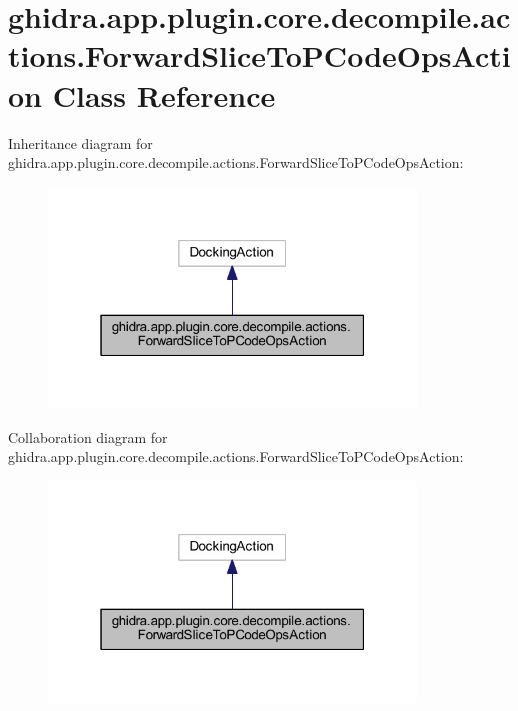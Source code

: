 \hypertarget{classghidra_1_1app_1_1plugin_1_1core_1_1decompile_1_1actions_1_1_forward_slice_to_p_code_ops_action}{}\section{ghidra.\+app.\+plugin.\+core.\+decompile.\+actions.\+Forward\+Slice\+To\+P\+Code\+Ops\+Action Class Reference}
\label{classghidra_1_1app_1_1plugin_1_1core_1_1decompile_1_1actions_1_1_forward_slice_to_p_code_ops_action}


Inheritance diagram for ghidra.\+app.\+plugin.\+core.\+decompile.\+actions.\+Forward\+Slice\+To\+P\+Code\+Ops\+Action\+:
\nopagebreak
\begin{figure}[H]
\begin{center}
\leavevmode
\includegraphics[width=277pt]{classghidra_1_1app_1_1plugin_1_1core_1_1decompile_1_1actions_1_1_forward_slice_to_p_code_ops_action__inherit__graph}
\end{center}
\end{figure}


Collaboration diagram for ghidra.\+app.\+plugin.\+core.\+decompile.\+actions.\+Forward\+Slice\+To\+P\+Code\+Ops\+Action\+:
\nopagebreak
\begin{figure}[H]
\begin{center}
\leavevmode
\includegraphics[width=277pt]{classghidra_1_1app_1_1plugin_1_1core_1_1decompile_1_1actions_1_1_forward_slice_to_p_code_ops_action__coll__graph}
\end{center}
\end{figure}

